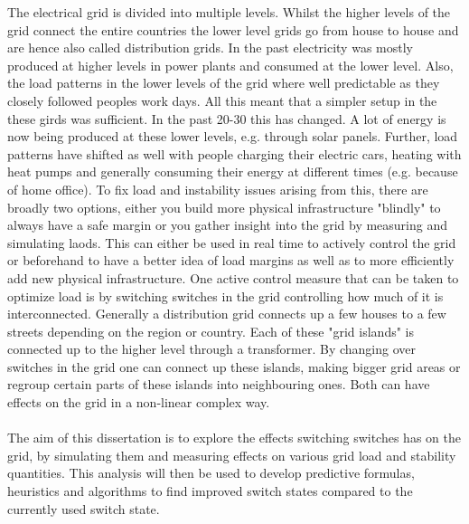 The electrical grid is divided into multiple levels. Whilst the higher levels of the grid connect
the entire countries the lower level grids go from house to house and are hence also called 
distribution grids. In the past electricity was mostly produced at higher levels in power plants
and consumed at the lower level. Also, the load patterns in the lower levels of the grid where
well predictable as they closely followed peoples work days. All this meant that a simpler setup
in the these girds was sufficient. In the past 20-30 this has changed. A lot of energy is now
being produced at these lower levels, e.g. through solar panels. Further, load patterns have shifted
as well with people charging their electric cars, heating with heat pumps and generally consuming
their energy at different times (e.g. because of home office)\autocite{venios}.
To fix load and instability issues arising
from this, there are broadly two options, either you build more physical infrastructure "blindly" to always
have a safe margin or you gather insight into the grid by measuring and simulating laods. This can either
be used in real time to actively control the grid or beforehand to have a better idea of load margins as well
as to more efficiently add new physical infrastructure. One active control measure that can be taken
to optimize load is by switching switches in the grid controlling how much of it is interconnected.
Generally a distribution grid connects up a few houses to a few streets depending on the region or country.
Each of these "grid islands" is connected up to the higher level through a transformer. By changing over
switches in the grid one can connect up these islands, making bigger grid areas or regroup certain parts
of these islands into neighbouring ones. Both can have effects on the grid in a non-linear complex way.\\
\\
The aim of this dissertation is to explore the effects switching switches has on the grid, by simulating them
and measuring effects on various grid load and stability quantities. This analysis will then be used to develop
predictive formulas, heuristics and algorithms to find improved switch states compared to the currently used
switch state.
